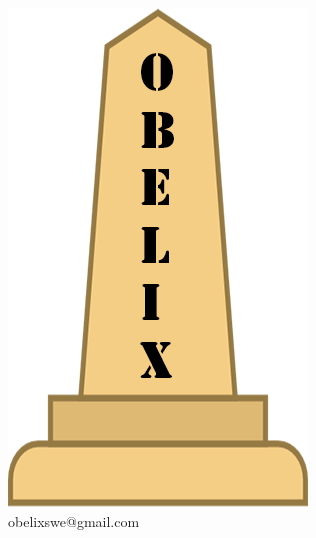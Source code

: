 \documentclass[10 pt,a4paper]{article}
\begin{document}
\begin{minipage}[adjusting]{.3\textwidth}
  \begin{centering}
    \includegraphics[width=.5\textwidth]{../../file_comuni/immagini/obelisk_sample_02.png}
    \\
    obelixswe@gmail.com
  \end{centering}
\end{minipage}
\end{document}
